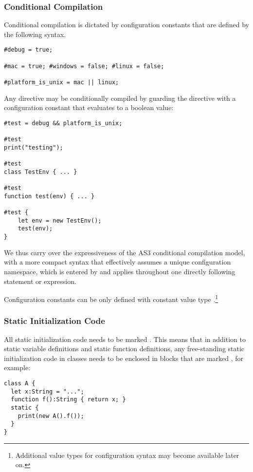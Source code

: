 \subsubsection{Conditional Compilation}
\label{sec:conditional-compilation}

Conditional compilation is dictated by configuration constants that are defined
by the following syntax.
\begin{verbatim}
#debug = true;

#mac = true; #windows = false; #linux = false;

#platform_is_unix = mac || linux;
\end{verbatim}

Any directive may be conditionally compiled by guarding the directive
with a configuration
constant that evaluates to a boolean value:
\begin{verbatim}
#test = debug && platform_is_unix;

#test
print("testing");

#test
class TestEnv { ... }

#test
function test(env) { ... }

#test {
    let env = new TestEnv();
    test(env);
}
\end{verbatim}

We thus carry over the expressiveness of the AS3 conditional compilation model,
with a more compact syntax that effectively assumes a unique configuration
namespace, which is entered by \code{\#} and applies throughout one
directly following statement or expression.

Configuration constants can be only defined with constant value type
.\footnote{Additional value types for configuration syntax may become
available later on.}

\subsubsection{Static Initialization Code}
All static initialization code needs to be marked . This
means that in addition to static variable definitions and static
function definitions, any free-standing static initialization code in classes needs to be
enclosed in blocks that are marked , for example:
\begin{verbatim}
class A {
  let x:String = "...";
  function f():String { return x; }
  static {
    print(new A().f());
  }
}
\end{verbatim}

